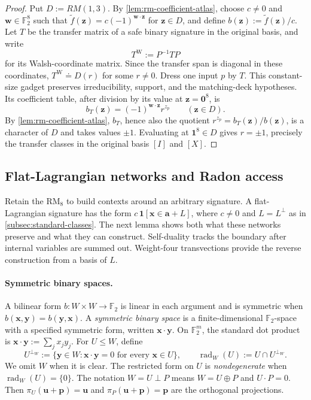 \documentclass[11pt,letterpaper,onecolumn]{article}
\theoremstyle{plain}
\theoremstyle{definition}
\theoremstyle{remark}
\newcommand{\Ftwo}{\mathbb F_2}
\newcommand{\one}{\mathbf 1}
\newcommand{\zero}{\mathbf 0}
\newcommand{\RMcore}{\mathrm{RM}_8}
\begin{document}
\begin{proof}
Put \(D:=RM(1,3)\).  By \cref{lem:rm-coefficient-atlas}, choose
\(c\ne0\) and \({\mathbf w}\in\Ftwo^8\) such that
\(\widetilde f({\mathbf z})=c(-1)^{{\mathbf w}\cdot {\mathbf z}}\) for \({\mathbf z}\in D\), and define
\(b({\mathbf z}):=\widetilde f({\mathbf z})/c\).  Let \(T\) be the transfer matrix of a safe binary signature in the original basis, and write
\[
 T^{\mathrm W}:=P^{-1}TP
\]
for its Walsh-coordinate matrix. Since the transfer span is diagonal in these coordinates,
\(T^{\mathrm W}\doteq D(r)\) for some \(r\ne0\).
Dress one input \(p\) by \(T\).  This constant-size gadget preserves
irreducibility, support, and the matching-deck hypotheses. Its coefficient
table, after division by its value at \({\mathbf z}=\zero^8\), is
\[
 b_T({\mathbf z})=(-1)^{{\mathbf w}\cdot {\mathbf z}}r^{z_p}
 \qquad({\mathbf z}\in D).
\]
By \cref{lem:rm-coefficient-atlas}, \(b_T\), hence also the quotient
\(r^{z_p}=b_T({\mathbf z})/b({\mathbf z})\), is a character of \(D\) and takes values
\(\pm1\).  Evaluating at \(\one^8\in D\) gives \(r=\pm1\), precisely the
transfer classes in the original basis \([I]\) and \([X]\).
\end{proof}

\subsection{Flat-Lagrangian networks and Radon access}

Retain the \(\RMcore\) to build contexts around an arbitrary
signature. A flat-Lagrangian signature has the form
\(c\,\one[{\mathbf{x}}\in{\mathbf{a}}+L]\), where \(c\ne0\) and \(L=L^\perp\)
as in \cref{subsec:standard-classes}. The next lemma
shows both what these networks preserve and what they can construct.
Self-duality tracks the boundary after internal variables are summed out.
Weight-four transvections provide the reverse construction from a basis
of \(L\).

\paragraph{Symmetric binary spaces.}
\label{subsubsec:symmetric-binary-spaces}

A bilinear form \(b:W\times W\to\Ftwo\) is linear in each argument and is
symmetric when \(b({\mathbf{x}},{\mathbf{y}})=b({\mathbf{y}},{\mathbf{x}})\).  A \emph{symmetric binary space} is a
finite-dimensional \(\Ftwo\)-space with a specified symmetric form, written
\({\mathbf{x}}\cdot {\mathbf{y}}\).  On \(\Ftwo^m\), the standard dot product is
\({\mathbf{x}}\cdot {\mathbf{y}}:=\sum_jx_jy_j\).  For \(U\le W\), define
\[
 U^{\perp_W}:=\{{\mathbf{y}}\in W:{\mathbf{x}}\cdot {\mathbf{y}}=0\text{ for every }{\mathbf{x}}\in U\},
 \qquad
 \operatorname{rad}_W(U):=U\cap U^{\perp_W}.
\]
We omit \(W\) when it is clear.  The restricted form on \(U\) is
\emph{nondegenerate} when \(\operatorname{rad}_W(U)=\{0\}\).
The notation \(W=U\perp P\) means \(W=U\oplus P\) and \(U\cdot P=0\).
Then \(\pi_U({\mathbf{u}}+{\mathbf{p}})={\mathbf{u}}\) and \(\pi_P({\mathbf{u}}+{\mathbf{p}})={\mathbf{p}}\) are the orthogonal projections.
\end{document}

